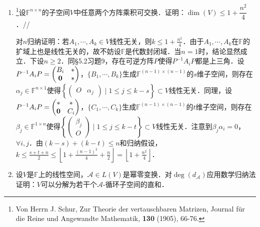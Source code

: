 \begin{enumerate}
\item \footnote{Von Herrn J. Schur, Zur Theorie der vertauschbaren Matrizen, Journal f\"ur die Reine und Angewandte Mathematik, {\bf 130} (1905), 66-76.}设$\mathbb{F}^{n\times n}$的子空间$V$中任意两个方阵乘积可交换．证明：$\dim(V)\le 1+\dfrac{n^2}{4}$．//

对$n$归纳证明：若$A_1,\cdots,A_k\in V$线性无关，则$k\le 1+\frac{n^2}{4}$．由于$A_1,\cdots,A_k$在$\mathbb{F}$的扩域上也是线性无关的，故不妨设$\mathbb{F}$是代数封闭域．当$n=1$时，结论显然成立．下设$n\ge 2$．同\S5.2习题9，存在可逆方阵$P$使得$P^{-1}A_iP$都是上三角．设$P^{-1}A_iP=\begin{pmatrix}B_i&* \\ {\bf 0}&*\end{pmatrix}$，$\{B_1,\cdots,B_k\}$生成$\mathbb{F}^{(n-1)\times(n-1)}$的$s$维子空间，则存在$\alpha_j\in\mathbb{F}^{n\times 1}$使得$\left\{\begin{pmatrix}O&\alpha_j\end{pmatrix}\mid 1\le j\le k-s\right\}\subset V$线性无关．同理，设$P^{-1}A_iP=\begin{pmatrix}*&* \\ {\bf 0}&C_i\end{pmatrix}$，$\{C_1,\cdots,C_k\}$生成$\mathbb{F}^{(n-1)\times(n-1)}$的$t$维子空间，则存在$\beta_j\in\mathbb{F}^{1\times n}$使得$\left\{\begin{pmatrix}\beta_j \\ O\end{pmatrix}\mid 1\le j\le k-t\right\}\subset V$线性无关．注意到$\beta_j\alpha_i=0$，$\forall i,j$．由$(k-s)+(k-t)\le n$和归纳假设，$k\le\frac{s+t+n}{2}\le\left\lfloor 1+\frac{(n-1)^2}{4}+\frac{n}{2}\right\rfloor=\left\lfloor 1+\frac{n^2}{4}\right\rfloor$．

\item 设$V$是$\mathbb{F}$上的线性空间，$\mathcal{A}\in L(V)$是幂零变换．对$\deg(d_{\mathcal{A}})$应用数学归纳法证明：$V$可以分解为若干个$\mathcal{A}$-循环子空间的直和．
\end{enumerate}

